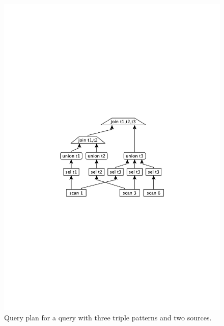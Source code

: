 \begin{figure}[htb]
  \centering
  \includegraphics[width=0.6\linewidth]{figs/plan.pdf}
  \caption{Query plan for a query with three triple patterns and two
    sources.}
\label{fig:plan}
\end{figure}



